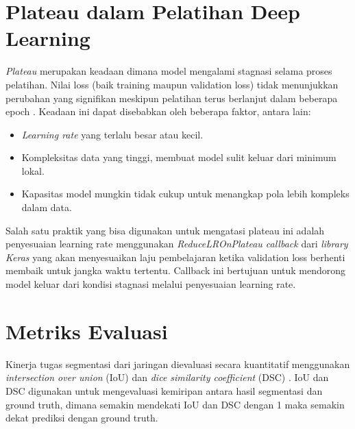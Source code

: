 \section{Plateau dalam Pelatihan Deep Learning}

\noindent \textit{Plateau} merupakan keadaan dimana model mengalami stagnasi selama proses pelatihan. Nilai loss (baik training maupun validation loss) tidak menunjukkan perubahan yang signifikan meskipun pelatihan terus berlanjut  dalam beberapa epoch \cite{ainsworth_plateau_2020}.  Keadaan ini dapat disebabkan oleh beberapa faktor, antara lain: 

\begin{itemize}
	\item \textit{Learning  rate} yang terlalu besar atau kecil.
	\item Kompleksitas data yang tinggi, membuat model sulit keluar dari minimum lokal.
	\item Kapasitas model mungkin tidak cukup untuk menangkap pola lebih kompleks dalam data.
\end{itemize}

\noindent Salah satu praktik yang bisa digunakan untuk mengatasi plateau ini adalah penyesuaian learning rate menggunakan \textit{ReduceLROnPlateau callback} dari \textit{library} \textit{Keras} yang akan menyesuaikan laju pembelajaran ketika validation loss berhenti membaik untuk jangka waktu tertentu. Callback ini bertujuan untuk mendorong model keluar dari kondisi stagnasi melalui penyesuaian learning rate.

\section{Metriks Evaluasi}
\noindent Kinerja tugas segmentasi dari jaringan dievaluasi secara kuantitatif menggunakan \textit{intersection over union }(IoU) dan \textit{dice similarity coefficient }(DSC) \cite{jiang_iu-net_2023}. IoU dan DSC digunakan untuk mengevaluasi kemiripan antara hasil segmentasi dan ground truth, dimana semakin mendekati IoU dan DSC dengan 1 maka semakin dekat prediksi dengan ground truth. %


